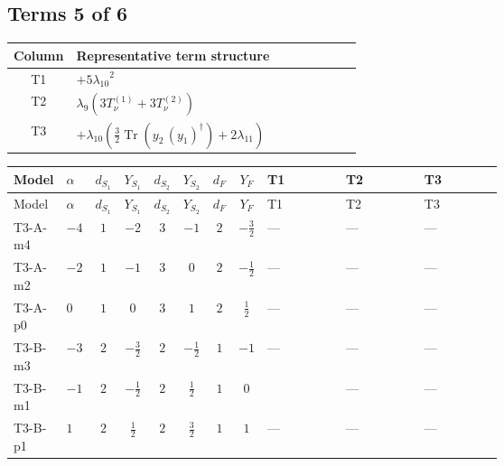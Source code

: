 \documentclass[8pt]{article}
\begin{document}
\begin{landscape}
\subsection*{Terms 5 of 6}
\begin{center}
\begin{tabular}{@{}c >{\raggedright\arraybackslash}p{0.82\linewidth}@{}}
\toprule
Column & Representative term structure \\
\midrule
T1 & \(\displaystyle +5 {\lambda_{10}}^2\) \\
\midrule
T2 & \(\displaystyle {\lambda_{9}} (3 T_{\nu}^{(1)}+3 T_{\nu}^{(2)})\) \\
\midrule
T3 & \(\displaystyle +{\lambda_{10}} \left(\frac{3}{2} \operatorname{Tr}\!\left({y_2}\,\left({y_1}\right)^{\dagger}\right)+2 {\lambda_{11}}\right)\) \\
\midrule
\bottomrule
\end{tabular}
\end{center}
\smallskip
\tiny
\begin{longtable}{@{}llcccccc >{\raggedright\arraybackslash}p{0.21\linewidth} >{\raggedright\arraybackslash}p{0.21\linewidth} >{\raggedright\arraybackslash}p{0.21\linewidth}@{}}
\toprule
Model & $\alpha$ & $d_{S_1}$ & $Y_{S_1}$ & $d_{S_2}$ & $Y_{S_2}$ & $d_F$ & $Y_F$ & T1 & T2 & T3 \\
\midrule
\endfirsthead
\toprule
Model & $\alpha$ & $d_{S_1}$ & $Y_{S_1}$ & $d_{S_2}$ & $Y_{S_2}$ & $d_F$ & $Y_F$ & T1 & T2 & T3 \\
\midrule
\endhead
T3-A-m4 & $-4$ & $1$ & $-2$ & $3$ & $-1$ & $2$ & $-\frac{3}{2}$ & --- & --- & --- \\
\midrule
T3-A-m2 & $-2$ & $1$ & $-1$ & $3$ & $0$ & $2$ & $-\frac{1}{2}$ & --- & --- & --- \\
\midrule
T3-A-p0 & $0$ & $1$ & $0$ & $3$ & $1$ & $2$ & $\frac{1}{2}$ & --- & --- & --- \\
\midrule
T3-B-m3 & $-3$ & $2$ & $-\frac{3}{2}$ & $2$ & $-\frac{1}{2}$ & $1$ & $-1$ & --- & --- & --- \\
\midrule
T3-B-m1 & $-1$ & $2$ & $-\frac{1}{2}$ & $2$ & $\frac{1}{2}$ & $1$ & $0$ & \scriptsize\adjustbox{max width=\linewidth}{$\begin{gathered} +5 {\lambda_{10}}^2 \\ +5 {\lambda_{11}}^2\end{gathered}$} & --- & --- \\
\midrule
T3-B-p1 & $1$ & $2$ & $\frac{1}{2}$ & $2$ & $\frac{3}{2}$ & $1$ & $1$ & --- & --- & --- \\

\end{longtable}
\end{landscape}
\end{document}
